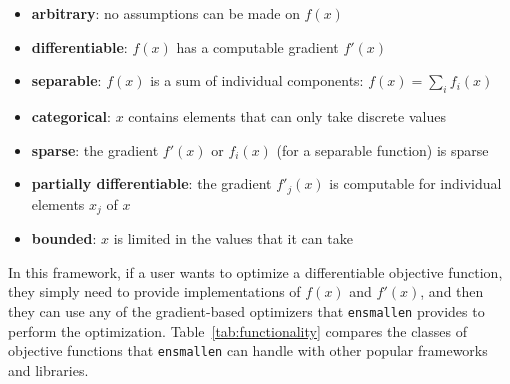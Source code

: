\documentclass{article}
\begin{document}
\begin{itemize}
  \item {\bf arbitrary}: no assumptions can be made on $f(x)$
  \item {\bf differentiable}: $f(x)$ has a computable gradient $f'(x)$
  \item {\bf separable}: $f(x)$ is a sum of individual components: $f(x) =
\sum_{i} f_i(x)$
  \item {\bf categorical}: $x$ contains elements that can only take discrete
values
  \item {\bf sparse}: the gradient $f'(x)$ or $f_i(x)$ (for a separable
function) is sparse
  \item {\bf partially differentiable}: the gradient $f'_j(x)$ is computable for
individual elements $x_j$ of $x$
  \item {\bf bounded}: $x$ is limited in the values that it can take
\end{itemize}

In this framework, if a user wants to optimize a differentiable objective
function, they simply need to provide implementations of $f(x)$ and $f'(x)$, and
then they can use any of the gradient-based optimizers that {\tt ensmallen}
provides to perform the optimization.  Table~\ref{tab:functionality} compares
the classes of objective functions that {\tt ensmallen} can handle with other
popular frameworks and libraries.
\end{document}
